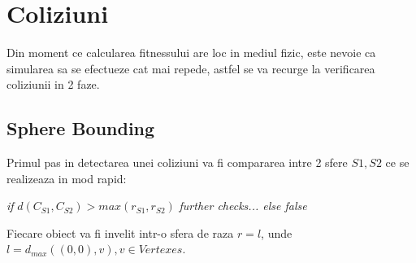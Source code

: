 \section{Coliziuni}

Din moment ce calcularea fitnessului are loc in mediul fizic, este nevoie ca simularea sa se efectueze cat mai repede, astfel se va recurge la verificarea coliziunii in 2 faze.
\subsection{Sphere Bounding}
Primul pas in detectarea unei coliziuni va fi compararea intre 2 sfere $S1,S2$ ce se realizeaza in mod rapid:
\begin{center}
\textit{if} $d(C_{S1},C_{S2}) > max(r_{S1},r_{S2})$ \textit{further checks... else false}
\end{center}

Fiecare obiect va fi invelit intr-o sfera de raza $r = l$, unde $l = d_{max}((0,0),v), v \in Vertexes$.